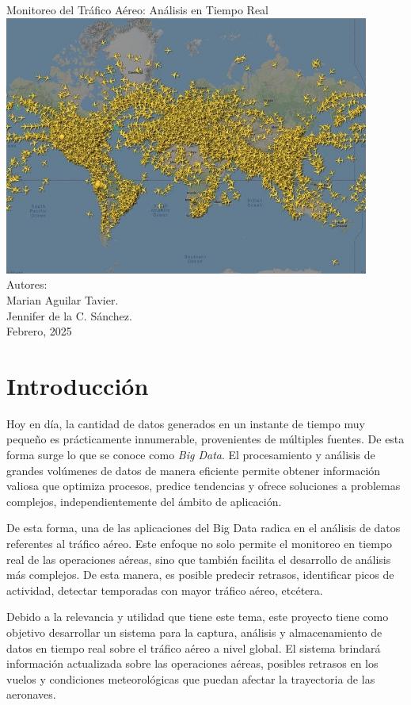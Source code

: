 \documentclass{article}
\begin{document}
\begin{titlepage}
    \centering
    \vfill
    \Huge Monitoreo del Tráfico Aéreo: Análisis en Tiempo Real\\[1cm]
    \includegraphics[width=0.9\textwidth]{presentation.jpg}  
    \vfill
    \Large Autores: \\Marian Aguilar Tavier. \\  Jennifer de la C. Sánchez. \\[1cm]
    \Large Febrero, 2025
    \vfill
\end{titlepage}
\tableofcontents
\newpage
\setcounter{secnumdepth}{0}

\section{Introducción}
Hoy en día, la cantidad de datos generados en un instante de tiempo muy pequeño es prácticamente innumerable, provenientes de múltiples fuentes. De esta forma surge lo que se conoce como \textit{Big Data}.
El procesamiento y análisis de grandes volúmenes de datos de manera eficiente permite obtener información valiosa que optimiza procesos, predice tendencias y ofrece soluciones a problemas complejos, independientemente del ámbito de aplicación.

De esta forma, una de las aplicaciones del Big Data radica en el análisis de datos referentes al tráfico aéreo. Este enfoque no solo permite el monitoreo en tiempo real de las operaciones aéreas, sino que también facilita el desarrollo de análisis más complejos. De esta manera, es posible predecir retrasos, identificar picos de actividad, detectar temporadas con mayor tráfico aéreo, etcétera.

Debido a la relevancia y utilidad que tiene este tema, este proyecto tiene como objetivo desarrollar un sistema para la captura, análisis y almacenamiento de datos en tiempo real sobre el tráfico aéreo a nivel global. El sistema brindará información actualizada sobre las operaciones aéreas, posibles retrasos en los vuelos y condiciones meteorológicas que puedan afectar la trayectoria de las aeronaves.  
\end{document}
